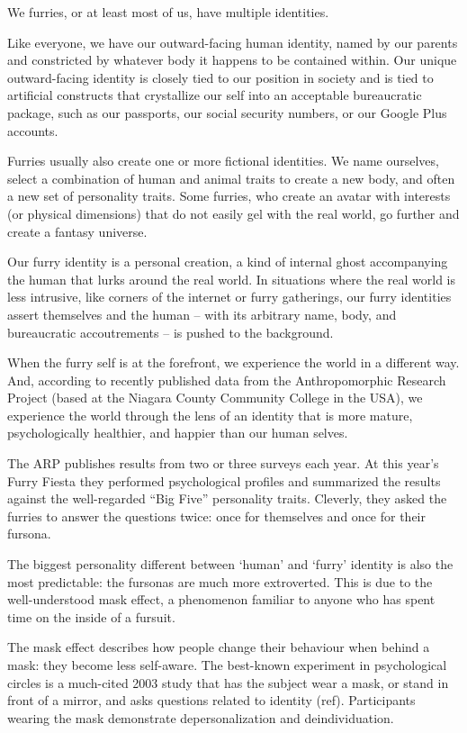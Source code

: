 
We furries, or at least most of us, have multiple identities.

Like everyone, we have our outward-facing human identity, named by our parents and constricted by whatever body it happens to be contained within. Our unique outward-facing identity is closely tied to our position in society and is tied to artificial constructs that crystallize our self into an acceptable bureaucratic package, such as our passports, our social security numbers, or our Google Plus accounts.

Furries usually also create one or more fictional identities. We name ourselves, select a combination of human and animal traits to create a new body, and often a new set of personality traits. Some furries, who create an avatar with interests (or physical dimensions) that do not easily gel with the real world, go further and create a fantasy universe.

Our furry identity is a personal creation, a kind of internal ghost accompanying the human that lurks around the real world. In situations where the real world is less intrusive, like corners of the internet or furry gatherings, our furry identities assert themselves and the human -- with its arbitrary name, body, and bureaucratic accoutrements -- is pushed to the background.

When the furry self is at the forefront, we experience the world in a different way. And, according to recently published data from the Anthropomorphic Research Project (based at the Niagara County Community College in the USA), we experience the world through the lens of an identity that is more mature, psychologically healthier, and happier than our human selves.

The ARP publishes results from two or three surveys each year. At this year's Furry Fiesta they performed psychological profiles and summarized the results against the well-regarded ``Big Five'' personality traits. Cleverly, they asked the furries to answer the questions twice: once for themselves and once for their fursona.

The biggest personality different between ‘human' and ‘furry' identity is also the most predictable: the fursonas are much more extroverted. This is due to the well-understood mask effect, a phenomenon familiar to anyone who has spent time on the inside of a fursuit.

The mask effect describes how people change their behaviour when behind a mask: they become less self-aware. The best-known experiment in psychological circles is a much-cited 2003 study that has the subject wear a mask, or stand in front of a mirror, and asks questions related to identity (ref). Participants wearing the mask demonstrate depersonalization and deindividuation.

